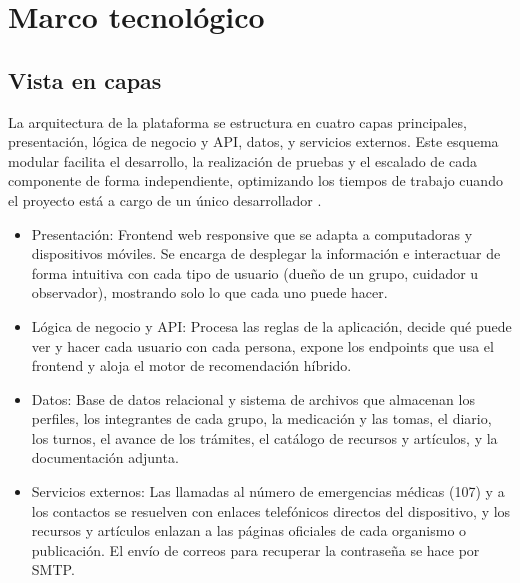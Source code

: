 
\chapter{Marco tecnológico}\label{cap:marco-tecnologico}

\section{Vista en capas}

La arquitectura de la plataforma se estructura en cuatro capas principales, presentación, lógica de negocio y API, datos, y servicios externos. Este esquema modular facilita el desarrollo, la realización de pruebas y el escalado de cada componente de forma independiente, optimizando los tiempos de trabajo cuando el proyecto está a cargo de un único desarrollador \citep{sommerville2016}.

\begin{itemize}
    \item Presentación: Frontend web responsive que se adapta a computadoras y dispositivos móviles. Se encarga de desplegar la información e interactuar de forma intuitiva con cada tipo de usuario (dueño de un grupo, cuidador u observador), mostrando solo lo que cada uno puede hacer.
    \item Lógica de negocio y API: Procesa las reglas de la aplicación, decide qué puede ver y hacer cada usuario con cada persona, expone los endpoints que usa el frontend y aloja el motor de recomendación híbrido.
    \item Datos: Base de datos relacional y sistema de archivos que almacenan los perfiles, los integrantes de cada grupo, la medicación y las tomas, el diario, los turnos, el avance de los trámites, el catálogo de recursos y artículos, y la documentación adjunta.
    \item Servicios externos: Las llamadas al número de emergencias médicas (107) y a los contactos se resuelven con enlaces telefónicos directos del dispositivo, y los recursos y artículos enlazan a las páginas oficiales de cada organismo o publicación. El envío de correos para recuperar la contraseña se hace por SMTP.
\end{itemize}


